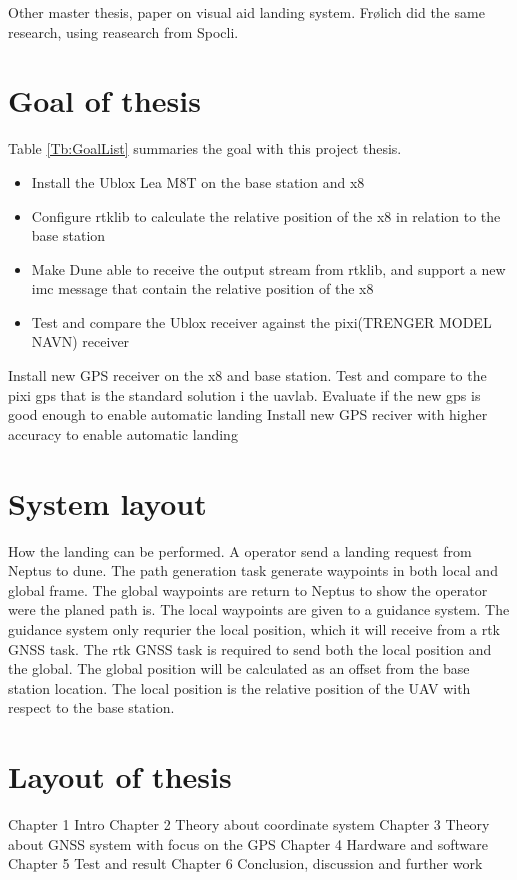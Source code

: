 Other master thesis, paper on visual aid landing system. Frølich did the same research, using reasearch from Spocli.
\section{Goal of thesis}
Table \ref{Tb:GoalList} summaries the goal with this project thesis.
\begin{itemize}\label{Tb:GoalList}
\item Install the Ublox Lea M8T on the base station and x8
\item Configure rtklib to calculate the relative position of the x8 in relation to the base station
\item Make Dune able to receive the output stream from rtklib, and support a new imc message that contain the relative position of the x8
\item Test and compare the Ublox receiver against the pixi(TRENGER MODEL NAVN) receiver
\end{itemize}
Install new GPS receiver on the x8 and base station. Test and compare to the pixi gps that is the standard solution i the uavlab. Evaluate if the new gps is good enough to enable automatic landing
Install new GPS reciver with higher accuracy to enable automatic landing
\section{System layout}
How the landing can be performed. A operator send a landing request from Neptus to dune. The path generation task generate waypoints in both local and global frame. The global waypoints are return to Neptus to show the operator were the planed path is. The local waypoints are given to a guidance system. The guidance system only requrier the local position, which it will receive from a rtk GNSS task. The rtk GNSS task is required to send both the local position and the global. The global position will be calculated as an offset from the base station location. The local position is the relative position of the UAV with respect to the base station.
\section{Layout of thesis}
Chapter 1 Intro
Chapter 2 Theory about coordinate system
Chapter 3 Theory about GNSS system with focus on the GPS
Chapter 4 Hardware and software
Chapter 5 Test and result
Chapter 6 Conclusion, discussion and further work



